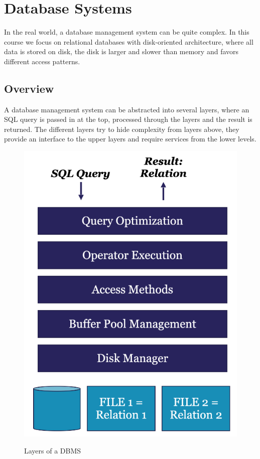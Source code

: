 \section{Database Systems}
In the real world, a database management system can be quite complex. In this course we focus on relational databases with disk-oriented architecture, where all data is stored on disk, the disk is larger and slower than memory and favors different access patterns.

\subsection{Overview}
A database management system can be abstracted into several layers, where an SQL query is passed in at the top, processed through the layers and the result is returned. The different layers try to hide complexity from layers above, they provide an interface to the upper layers and require services from the lower levels.
\begin{figure}[H]
\centering
\includegraphics[width=.3\textwidth]{images/database_stack.PNG}
\label{database_stack}
\caption{Layers of a DBMS}
\end{figure}
